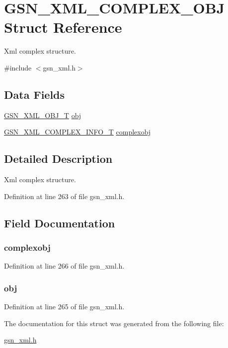 \hypertarget{a00430}{
\section{GSN\_\-XML\_\-COMPLEX\_\-OBJ Struct Reference}
\label{a00430}
}


Xml complex structure.  




{\ttfamily \#include $<$gsn\_\-xml.h$>$}

\subsection*{Data Fields}
\begin{DoxyCompactItemize}
\item 
\hyperlink{a00435}{GSN\_\-XML\_\-OBJ\_\-T} \hyperlink{a00430_aada292545195f6cd94a4330b76595017}{obj}
\item 
\hyperlink{a00429}{GSN\_\-XML\_\-COMPLEX\_\-INFO\_\-T} \hyperlink{a00430_ab853b44a640a20fa75979a35f32e2246}{complexobj}
\end{DoxyCompactItemize}


\subsection{Detailed Description}
Xml complex structure. 

Definition at line 263 of file gsn\_\-xml.h.



\subsection{Field Documentation}
\hypertarget{a00430_ab853b44a640a20fa75979a35f32e2246}{
\subsubsection[{complexobj}]{ {\bf complexobj}}}
\label{a00430_ab853b44a640a20fa75979a35f32e2246}


Definition at line 266 of file gsn\_\-xml.h.

\hypertarget{a00430_aada292545195f6cd94a4330b76595017}{
\subsubsection[{obj}]{ {\bf obj}}}
\label{a00430_aada292545195f6cd94a4330b76595017}


Definition at line 265 of file gsn\_\-xml.h.



The documentation for this struct was generated from the following file:\begin{DoxyCompactItemize}
\item 
\hyperlink{a00616}{gsn\_\-xml.h}\end{DoxyCompactItemize}

